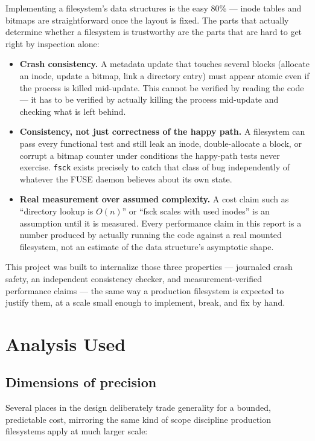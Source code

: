 \documentclass[11pt]{article}
\begin{document}
Implementing a filesystem's data structures is the easy 80\% — inode tables and bitmaps are
straightforward once the layout is fixed. The parts that actually determine whether a filesystem
is trustworthy are the parts that are hard to get right by inspection alone:

\begin{itemize}
    \item \textbf{Crash consistency.} A metadata update that touches several blocks (allocate an
    inode, update a bitmap, link a directory entry) must appear atomic even if the process is
    killed mid-update. This cannot be verified by reading the code — it has to be verified by
    actually killing the process mid-update and checking what is left behind.
    \item \textbf{Consistency, not just correctness of the happy path.} A filesystem can pass
    every functional test and still leak an inode, double-allocate a block, or corrupt a bitmap
    counter under conditions the happy-path tests never exercise. \texttt{fsck} exists precisely
    to catch that class of bug independently of whatever the FUSE daemon believes about its own
    state.
    \item \textbf{Real measurement over assumed complexity.} A cost claim such as ``directory
    lookup is $O(n)$'' or ``fsck scales with used inodes'' is an assumption until it is measured.
    Every performance claim in this report is a number produced by actually running the code
    against a real mounted filesystem, not an estimate of the data structure's asymptotic shape.
\end{itemize}

This project was built to internalize those three properties — journaled crash safety, an
independent consistency checker, and measurement-verified performance claims — the same way a
production filesystem is expected to justify them, at a scale small enough to implement, break,
and fix by hand.

\section{Analysis Used}

\subsection{Dimensions of precision}

Several places in the design deliberately trade generality for a bounded, predictable cost, mirroring
the same kind of scope discipline production filesystems apply at much larger scale:
\end{document}
